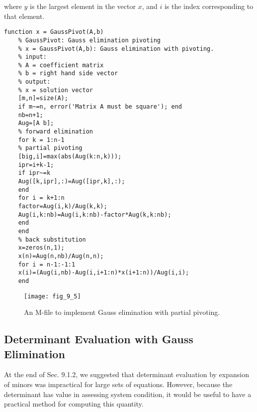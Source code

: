 \documentclass[../main.tex]{subfiles}
\begin{document}
where $y$ is the largest element in the vector $x$, and $i$ is the index corresponding to that element.

\begin{lstlisting}[numbers=none,frame=none]
    function x = GaussPivot(A,b)
    % GaussPivot: Gauss elimination pivoting
    % x = GaussPivot(A,b): Gauss elimination with pivoting.
    % input:
    % A = coefficient matrix
    % b = right hand side vector
    % output:
    % x = solution vector
    [m,n]=size(A);
    if m~=n, error('Matrix A must be square'); end
    nb=n+1;
    Aug=[A b];
    % forward elimination
    for k = 1:n-1
    % partial pivoting
    [big,i]=max(abs(Aug(k:n,k)));
    ipr=i+k-1;
    if ipr~=k
    Aug([k,ipr],:)=Aug([ipr,k],:);
    end
    for i = k+1:n
    factor=Aug(i,k)/Aug(k,k);
    Aug(i,k:nb)=Aug(i,k:nb)-factor*Aug(k,k:nb);
    end
    end
    % back substitution
    x=zeros(n,1);
    x(n)=Aug(n,nb)/Aug(n,n);
    for i = n-1:-1:1
    x(i)=(Aug(i,nb)-Aug(i,i+1:n)*x(i+1:n))/Aug(i,i);
    end
\end{lstlisting}
\begin{figure}[H]
    \centering
    \texttt{[image: fig\_9\_5]}
    \caption{\textsf{An M-file to implement Gauss elimination with partial pivoting.}}
    \label{fig:fig_9_5}
\end{figure}

\subsection{Determinant Evaluation with Gauss Elimination}

At the end of Sec. 9.1.2, we suggested that determinant evaluation by expansion of minors was impractical for large sets of equations. However, because the determinant has value in assessing system condition, it would be useful to have a practical method for computing this quantity.
\end{document}

